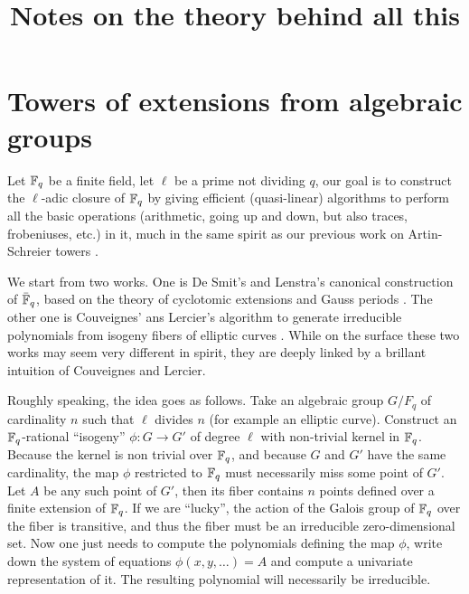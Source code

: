 \documentclass[11pt]{article}
\title{Notes on the theory behind all this}
\begin{document}
\maketitle

\setcounter{tocdepth}{3}
\tableofcontents
\vspace*{1cm}

\section{Towers of extensions from algebraic groups}

Let $\mathbb{F}_q$ be a finite field, let $\ell$ be a prime not dividing $q$,
our goal is to construct the $\ell$-adic closure of $\mathbb{F}_q$ by giving
efficient (quasi-linear) algorithms to perform all the basic
operations (arithmetic, going up and down, but also traces,
frobeniuses, etc.) in it, much in the same spirit as our previous work
on Artin-Schreier towers \cite{df+schost12}.

We start from two works. One is De Smit's and Lenstra's canonical
construction of $\bar{\mathbb{F}}_q$, based on the theory of cyclotomic
extensions and Gauss periods \cite{lenstra+desmit08-stdmodels}. The
other one is Couveignes' ans Lercier's algorithm to generate
irreducible polynomials from isogeny fibers of elliptic curves
\cite{couveignes+lercier11}. While on the surface these two works may
seem very different in spirit, they are deeply linked by a brillant
intuition of Couveignes and Lercier.

Roughly speaking, the idea goes as follows. Take an algebraic group
$G/F_q$ of cardinality $n$ such that $\ell$ divides $n$ (for example
an elliptic curve). Construct an $\mathbb{F}_q$-rational ``isogeny''
$\phi:G\to G'$ of degree $\ell$ with non-trivial kernel in
$\mathbb{F}_q$. Because the kernel is non trivial over $\mathbb{F}_q$, and because $G$
and $G'$ have the same cardinality, the map $\phi$ restricted to
$\mathbb{F}_q$ must necessarily miss some point of $G'$. Let $A$ be any such
point of $G'$, then its fiber contains $n$ points defined over a
finite extension of $\mathbb{F}_q$. If we are ``lucky'', the action of the
Galois group of $\mathbb{F}_q$ over the fiber is transitive, and thus the
fiber must be an irreducible zero-dimensional set. Now one just needs
to compute the polynomials defining the map $\phi$, write down the
system of equations $\phi(x,y,\ldots)=A$ and compute a univariate
representation of it. The resulting polynomial will necessarily be
irreducible.
\end{document}
